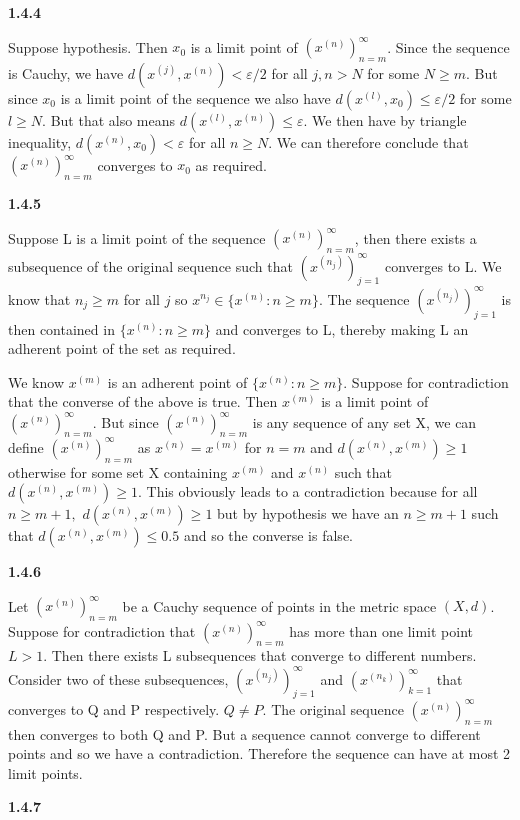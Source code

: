 \documentclass[12pt]{article}
\begin{document}
\textbf{1.4.4}

Suppose hypothesis. Then $x_0$ is a limit point of $(x^{(n)})^\infty_{n=m}$. Since the sequence is Cauchy, we have $d(x^{(j)},x^{(n)})< \varepsilon/2$ for all $j,n>N$ for some $N\geq m$. But since $x_0$ is a limit point of the sequence we also have $d(x^{(l)}, x_0)\leq \varepsilon/2$ for some $l\geq N$. But that also means $d(x^{(l)},x^{(n)})\leq \varepsilon$. We then have by triangle inequality, $d(x^{(n)}, x_0)<\varepsilon$ for all $n\geq N$. We can therefore conclude that $(x^{(n)})^\infty_{n=m}$ converges to $x_0$ as required. 

\textbf{1.4.5}

Suppose L is a limit point of the sequence $(x^{(n)})^\infty_{n=m}$, then there exists a subsequence of the original sequence such that $(x^{(n_j)})^\infty_{j=1}$ converges to L. We know that $n_j\geq m$ for all $j$ so $x^{n_j}\in \{x^{(n)}:n\geq m\}$. The sequence $(x^{(n_j)})^\infty_{j=1}$ is then contained in $\{x^{(n)}:n\geq m\}$ and converges to L, thereby making L an adherent point of the set as required.

We know $x^{(m)}$ is an adherent point of $\{x^{(n)}:n\geq m\}$. Suppose for contradiction that the converse of the above is true. Then $x^{(m)}$ is a limit point of $(x^{(n)})^\infty_{n=m}$. But since $(x^{(n)})^\infty_{n=m}$ is any sequence of any set X, we can define $(x^{(n)})^\infty_{n=m}$ as $x^{(n)} = x^{(m)}$ for $n=m$ and $d(x^{(n)},x^{(m)})\geq 1$ otherwise for some set X containing $x^{(m)}$ and $x^{(n)}$ such that $d(x^{(n)},x^{(m)})\geq 1$. This obviously leads to a contradiction because for all $n\geq m+1,$ $d(x^{(n)},x^{(m)})\geq 1$ but by hypothesis we have an $n\geq m+1$ such that $d(x^{(n)},x^{(m)})\leq 0.5$ and so the converse is false. 

\textbf{1.4.6}

Let $(x^{(n)})^\infty_{n=m}$ be a Cauchy sequence of points in the metric space $(X,d)$. Suppose for contradiction that $(x^{(n)})^\infty_{n=m}$ has more than one limit point $L>1$. Then there exists L subsequences that converge to different numbers. Consider two of these subsequences, $(x^{(n_j)})^\infty_{j=1}$ and $(x^{(n_k)})^\infty_{k=1}$ that converges to Q and P respectively. $Q\neq P$. The original sequence $(x^{(n)})^\infty_{n=m}$ then converges to both Q and P. But a sequence cannot converge to different points and so we have a contradiction. Therefore the sequence can have at most 2 limit points. 

\textbf{1.4.7}
\end{document}
